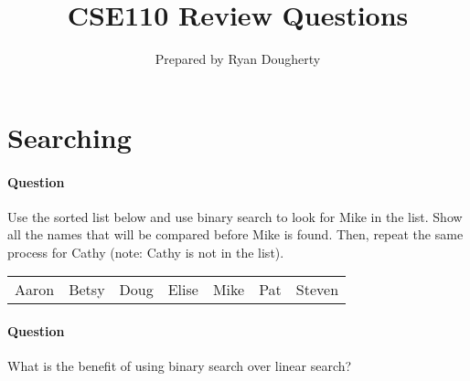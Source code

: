 \documentclass{article}
\title{CSE110 Review Questions}
\author{Prepared by Ryan Dougherty}
\date{}
\begin{document}
\maketitle

\section*{Searching}


\setcounter{question_num}{1}
\paragraph{Question }
Use the sorted list below and use binary search to look for Mike in the list. Show all the names that will be compared before Mike is found. Then, repeat the same process for Cathy (note: Cathy is not in the list).
\begin{table}[h]
\begin{tabular}{lllllll}
Aaron & Betsy & Doug & Elise & Mike & Pat & Steven
\end{tabular}
\end{table}

\addtocounter{question_num}{1}
\paragraph{Question }
What is the benefit of using binary search over linear search?
\end{document}
